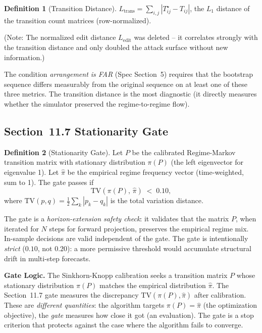 \documentclass[11pt,a4paper]{article}
\theoremstyle{definition}
\newtheorem{definition}{Definition}
\begin{document}
\begin{definition}[Transition Distance]
$L_{\text{trans}} = \sum_{i,j} |T^{\star}_{ij} - T_{ij}|$, the $L_1$ distance of the transition count matrices (row-normalized).
\end{definition}

(Note: The normalized edit distance $L_{\text{edit}}$ was deleted -- it correlates strongly with the transition distance and only doubled the attack surface without new information.)

The condition \emph{arrangement is FAR} (Spec Section~5) requires that the bootstrap sequence differs measurably from the original sequence on at least one of these three metrics. The transition distance is the most diagnostic (it directly measures whether the simulator preserved the regime-to-regime flow).

\subsection{Section~11.7 Stationarity Gate}

\begin{definition}[Stationarity Gate]
Let $P$ be the calibrated Regime-Markov transition matrix with stationary distribution $\pi(P)$ (the left eigenvector for eigenvalue 1). Let $\hat{\pi}$ be the empirical regime frequency vector (time-weighted, sum to 1). The gate passes if
\[
\text{TV}(\pi(P),\, \hat{\pi}) \;<\; 0.10,
\]
where $\text{TV}(p,q) = \tfrac{1}{2}\sum_k |p_k - q_k|$ is the total variation distance.
\end{definition}

The gate is a \emph{horizon-extension safety check}: it validates that the matrix $P$, when iterated for $N$ steps for forward projection, preserves the empirical regime mix. In-sample decisions are valid independent of the gate. The gate is intentionally \emph{strict} ($0.10$, not $0.20$): a more permissive threshold would accumulate structural drift in multi-step forecasts.

\textbf{Gate Logic.} The Sinkhorn-Knopp calibration seeks a transition matrix $P$ whose stationary distribution $\pi(P)$ matches the empirical distribution $\hat{\pi}$. The Section~11.7 gate measures the discrepancy $\text{TV}(\pi(P), \hat{\pi})$ after calibration. These are \emph{different quantities}: the algorithm targets $\pi(P) = \hat{\pi}$ (the optimization objective), the \emph{gate} measures how close it got (an evaluation). The gate is a stop criterion that protects against the case where the algorithm fails to converge.
\end{document}
